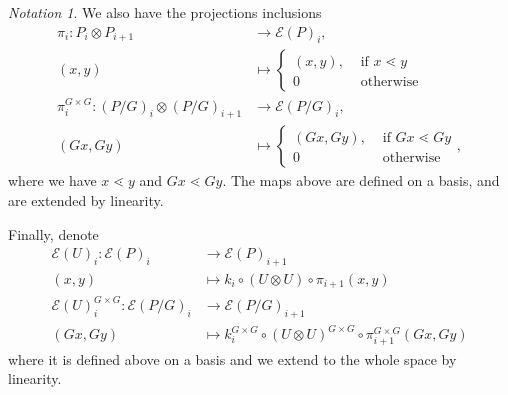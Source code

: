 \documentclass[10 pt]{amsart}
\theoremstyle{plain}
\theoremstyle{definition}
\theoremstyle{remark}
\newtheorem{note}[thm]{Notation}
\numberwithin{equation}{section}
\begin{document}
\begin{note}
We also have the projections inclusions
\begin{align*}
	\pi_i:P_i \otimes P_{i+1} & \rightarrow \mathcal E(P)_{i},\\
	(x, y) &\mapsto  \begin{cases}
	(x, y), &\text{ if }x\lessdot y\\
	0 &\text { otherwise}
\end{cases}\\
	\pi_i^{G\times G}: (P/G)_i \otimes (P/G)_{i+1} &\rightarrow\mathcal E(P/G)_i,\\
	(Gx, Gy) &\mapsto \begin{cases}
	(Gx, Gy), &\text{ if }Gx\lessdot Gy\\
	0 &\text { otherwise}
\end{cases},
\end{align*}
where we have $x \lessdot y$ and $Gx \lessdot Gy.$ The maps above are defined on a basis, and are extended by linearity.

Finally, denote
\begin{align*}
	\mathcal E(U)_i:\mathcal E(P)_i &\rightarrow \mathcal E(P)_{i+1}\\
	(x, y) &\mapsto k_i \circ (U \otimes U) \circ \pi_{i+1}(x, y)\\
\mathcal E(U)^{G\times G}_i:\mathcal E(P/G)_i & \rightarrow \mathcal E(P/G)_{i+1}\\
	(Gx, Gy) &\mapsto k^{G\times G}_i \circ (U \otimes U)^{G\times G} \circ \pi^{G\times G}_{i+1}(Gx, Gy)
\end{align*}
where it is defined above on a basis and we extend to the whole space by linearity.
\end{note}
\end{document}
